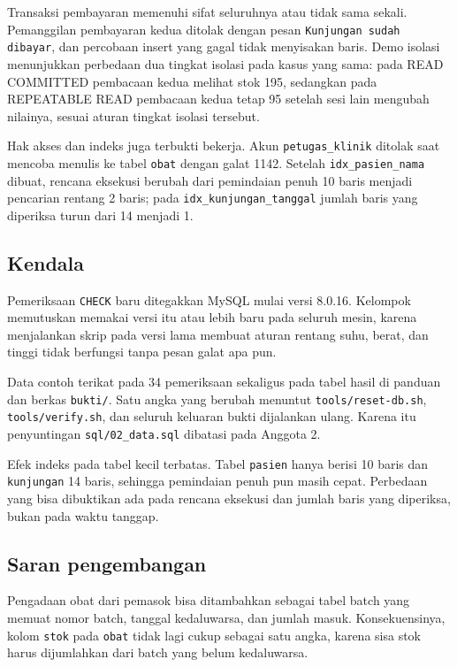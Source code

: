 \documentclass[12pt,a4paper]{article}
\begin{document}
Transaksi pembayaran memenuhi sifat seluruhnya atau tidak sama sekali.
Pemanggilan pembayaran kedua ditolak dengan pesan \texttt{Kunjungan sudah
dibayar}, dan percobaan insert yang gagal tidak menyisakan baris. Demo isolasi
menunjukkan perbedaan dua tingkat isolasi pada kasus yang sama: pada READ
COMMITTED pembacaan kedua melihat stok 195, sedangkan pada REPEATABLE READ
pembacaan kedua tetap 95 setelah sesi lain mengubah nilainya, sesuai aturan
tingkat isolasi tersebut.

Hak akses dan indeks juga terbukti bekerja. Akun \texttt{petugas\_klinik}
ditolak saat mencoba menulis ke tabel \texttt{obat} dengan galat 1142. Setelah
\texttt{idx\_pasien\_nama} dibuat, rencana eksekusi berubah dari pemindaian
penuh 10 baris menjadi pencarian rentang 2 baris; pada
\texttt{idx\_kunjungan\_tanggal} jumlah baris yang diperiksa turun dari 14
menjadi 1.

\subsection{Kendala}

Pemeriksaan \texttt{CHECK} baru ditegakkan MySQL mulai versi 8.0.16. Kelompok
memutuskan memakai versi itu atau lebih baru pada seluruh mesin, karena
menjalankan skrip pada versi lama membuat aturan rentang suhu, berat, dan tinggi
tidak berfungsi tanpa pesan galat apa pun.

Data contoh terikat pada 34 pemeriksaan sekaligus pada tabel hasil di panduan
dan berkas \texttt{bukti/}. Satu angka yang berubah menuntut
\texttt{tools/reset-db.sh}, \texttt{tools/verify.sh}, dan seluruh keluaran bukti
dijalankan ulang. Karena itu penyuntingan \texttt{sql/02\_data.sql} dibatasi
pada Anggota 2.

Efek indeks pada tabel kecil terbatas. Tabel \texttt{pasien} hanya berisi 10
baris dan \texttt{kunjungan} 14 baris, sehingga pemindaian penuh pun masih
cepat. Perbedaan yang bisa dibuktikan ada pada rencana eksekusi dan jumlah baris
yang diperiksa, bukan pada waktu tanggap.

\subsection{Saran pengembangan}

Pengadaan obat dari pemasok bisa ditambahkan sebagai tabel batch yang memuat
nomor batch, tanggal kedaluwarsa, dan jumlah masuk. Konsekuensinya, kolom
\texttt{stok} pada \texttt{obat} tidak lagi cukup sebagai satu angka, karena
sisa stok harus dijumlahkan dari batch yang belum kedaluwarsa.
\end{document}
